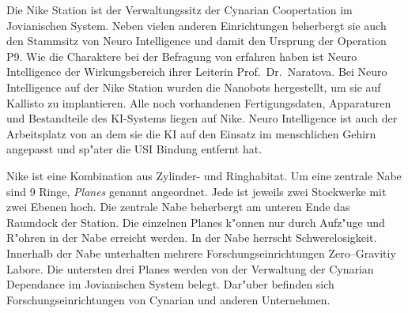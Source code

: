 
Die Nike Station ist der Verwaltungssitz der Cynarian Coopertation im Jovianischen System. Neben vielen anderen Einrichtungen beherbergt sie auch den Stammsitz von Neuro Intelligence und damit den Ursprung der Operation P9. Wie die Charaktere bei der Befragung von \ml{} erfahren haben ist Neuro Intelligence der Wirkungsbereich ihrer Leiterin Prof.~Dr.~Naratova. Bei Neuro Intelligence auf der Nike Station wurden die Nanobots hergestellt, um sie auf Kallisto zu implantieren. Alle noch vorhandenen Fertigungsdaten, Apparaturen und Bestandteile des KI-Systems liegen auf Nike. Neuro Intelligence ist auch der Arbeitsplatz von \ml{} an dem sie die KI auf den Einsatz im menschlichen Gehirn angepasst und sp"ater die USI Bindung entfernt hat.

Nike ist eine Kombination aus Zylinder- und Ringhabitat. Um eine zentrale Nabe sind 9 Ringe, \emph{Planes} genannt angeordnet. Jede ist jeweils zwei Stockwerke mit zwei Ebenen hoch. Die zentrale Nabe beherbergt am unteren Ende das Raumdock der Station.  Die einzelnen Planes k"onnen nur durch Aufz"uge und R"ohren in der Nabe erreicht werden. In der Nabe herrscht Schwerelosigkeit. Innerhalb der Nabe unterhalten mehrere Forschungseinrichtungen Zero--Gravitiy Labore. Die untersten drei Planes werden von der Verwaltung der Cynarian Dependance im Jovianischen System belegt. Dar"uber befinden sich Forschungseinrichtungen von Cynarian und anderen Unternehmen.

